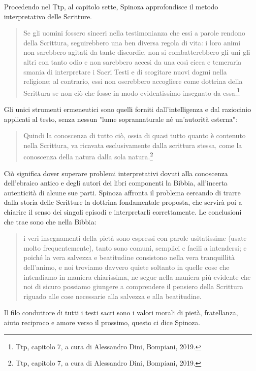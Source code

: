 Procedendo nel Ttp, al capitolo sette, Spinoza approfondisce il metodo interpretativo delle Scritture. 

\begin{quotation}
	\small Se gli uomini fossero sinceri nella testimonianza che essi a parole rendono della
	Scrittura, seguirebbero una ben diversa regola di vita: i loro animi non sarebbero
	agitati da tante discordie, non si combatterebbero gli uni gli altri con tanto odio
	e non sarebbero accesi da una così cieca e temeraria smania di interpretare i Sacri
	Testi e di scogitare nuovi dogmi nella religione; al contrario, essi non oserebbero
	accogliere come dottrina della Scrittura se non ciò che fosse in modo evidentissimo
	insegnato da essa.\footnote{Ttp, capitolo 7, a cura di Alessandro Dini, Bompiani, 2019.}
\end{quotation}

Gli unici strumenti ermeneutici sono quelli forniti dall'intelligenza e dal raziocinio applicati al testo, senza nessun "lume soprannaturale né un’autorità esterna":

\begin{quotation}
	\small Quindi la conoscenza di
	tutto ciò, ossia di quasi tutto quanto è contenuto nella Scrittura, va ricavata
	esclusivamente dalla scrittura stessa, come la conoscenza della natura dalla sola
	natura.\footnote{Ttp, capitolo 7, a cura di Alessandro Dini, Bompiani, 2019.}
\end{quotation}

Ciò significa dover superare problemi interpretativi dovuti alla conoscenza dell'ebraico antico e degli autori dei libri componenti la Bibbia, all'incerta autenticità di alcune sue parti. Spinoza affronta il problema cercando di trarre dalla storia delle Scritture la dottrina fondamentale proposta, che servirà poi a chiarire il senso dei singoli episodi e interpretarli correttamente. Le conclusioni che trae sono che nella Bibbia:

\begin{quotation}
	\small i veri insegnamenti della pietà sono espressi con parole usitatissime (usate molto frequentemente), tanto sono comuni, semplici e facili a intendersi; e poiché la vera salvezza e beatitudine consistono nella vera tranquillità dell'animo, e noi troviamo davvero quiete soltanto in quelle cose che intendiamo in maniera chiarissima, ne segue nella maniera più evidente che noi di sicuro possiamo giungere a comprendere il pensiero della Scrittura riguado alle cose necessarie alla salvezza e alla beatitudine.
\end{quotation}

Il filo conduttore di tutti i testi sacri sono i valori morali di pietà, fratellanza, aiuto reciproco e amore verso il prossimo, questo ci dice Spinoza.


\newpage